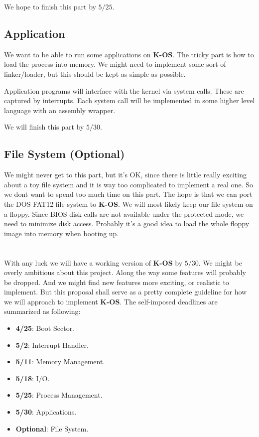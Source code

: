 \documentclass[dvips,11pt]{article}
\begin{document}
We hope to finish this part by $5/25$.


\subsection{\textbf{Application}}
We want to be able to run some applications on {\bf K-OS}. The tricky
part is how to load the process into memory. We might need to
implement some sort of linker/loader, but this should be kept as simple
as possible. 

Application programs will interface with the kernel via system
calls. These are captured by interrupts. Each system call will be
implemented in some higher level language with an assembly
wrapper. 

We will finish this part by $5/30$.


\subsection{\textbf{File System} (Optional)}
We might never get to this part, but it's OK, since there is little
really exciting about a toy file system and it is way too complicated
to implement a real one. 
So we dont want to spend too much time on this part. The hope is that we
can port the DOS FAT12 file system to {\bf K-OS}. We will most likely
keep our file system on a floppy. Since BIOS disk calls are not
available under the protected mode, we need to minimize disk
access. Probably it's a good idea to load the whole floppy image into
memory when booting up.


\section{\textbf{}}
With any luck we will have a working version of {\bf K-OS} by $5/30$. 
We might be overly ambitious about this project. Along the way
some features will probably be dropped. And we might find new features
more exciting, or realistic to implement. But this proposal shall serve as
a pretty complete guideline for how we will approach to implement
{\bf K-OS}. The self-imposed deadlines are summarized as following:

\begin{itemize}
\item {\bf 4/25}: Boot Sector.
\item {\bf 5/2}: Interrupt Handler.
\item {\bf 5/11}: Memory Management.
\item {\bf 5/18}: I/O.
\item {\bf 5/25}: Process Management.
\item {\bf 5/30}: Applications.
\item {\bf Optional}: File System.



\end{itemize}
\end{document}
